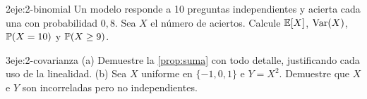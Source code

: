 \begin{ejercicio}{2}{eje:2-binomial}
Un modelo responde a 10 preguntas independientes y acierta cada una con probabilidad $0{,}8$. Sea $X$ el número de aciertos. Calcule $\mathbb{E}[X]$, $\operatorname{Var}(X)$, $\mathbb{P}(X=10)$ y $\mathbb{P}(X\ge 9)$.
\end{ejercicio}

\begin{ejercicio}{3}{eje:2-covarianza}
(a) Demuestre la \cref{prop:suma} con todo detalle, justificando cada uso de la linealidad. (b) Sea $X$ uniforme en $\{-1,0,1\}$ e $Y=X^{2}$. Demuestre que $X$ e $Y$ son incorreladas pero no independientes.
\end{ejercicio}

